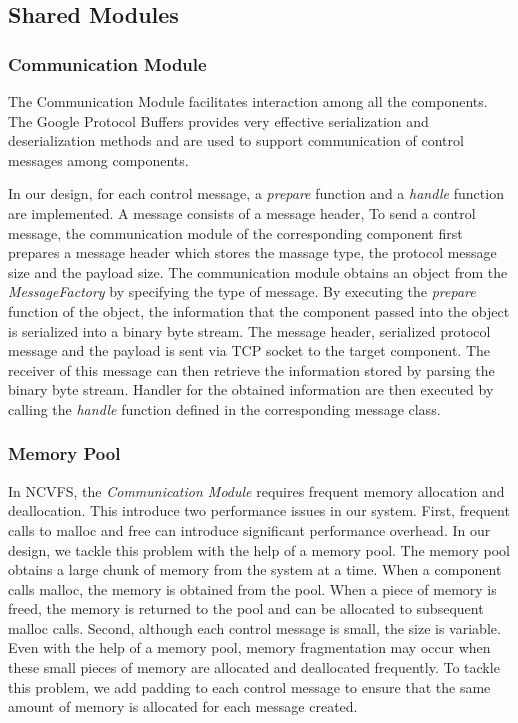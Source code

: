 \documentclass{article}
\begin{document}
\subsection{Shared Modules}

\subsubsection{Communication Module}

The Communication Module facilitates interaction among all the components. The Google Protocol Buffers 
provides very effective serialization and deserialization methods and are used to support communication 
of control messages among components.

In our design, for each control message, a \textit{prepare} function and a \textit{handle} function are implemented.
A message consists of a message header, 
To send a control message, the communication module of the corresponding component first prepares a 
message header which stores the massage type, the protocol message size and the payload size. The 
communication module obtains an object from the \textit{MessageFactory} by specifying the type of 
message. By executing the \textit{prepare} function of the object, the information that the component 
passed into the object is serialized into a binary byte stream. 
The message header, serialized protocol message and the payload is sent via TCP socket to the target component. 
The receiver of this message can then 
retrieve the information stored by parsing the binary byte stream. Handler for the obtained information are
then executed by calling the \textit{handle} function defined in the corresponding message class.

\subsubsection{Memory Pool}

In NCVFS, the \textit{Communication Module} requires frequent memory allocation and deallocation. 
This introduce two performance issues in our system. First, frequent calls to malloc and free 
can introduce significant performance overhead. In our design, we tackle this problem with the
help of a memory pool. The memory pool obtains a large chunk of memory from the system at a time. 
When a component calls malloc, the memory is obtained from the pool. When a piece of memory is freed,
the memory is returned to the pool and can be allocated to subsequent malloc calls. Second, although
each control message is small, the size is variable. Even with the help of a memory pool, 
memory fragmentation may occur when these small pieces of memory are allocated and deallocated frequently. 
To tackle this problem, we add padding to each control message to ensure that the same amount of memory is
allocated for each message created.
\end{document}
